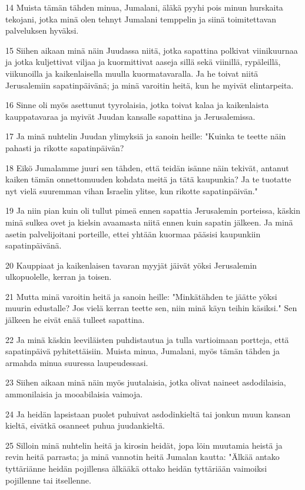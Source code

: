 \par 14 Muista tämän tähden minua, Jumalani, äläkä pyyhi pois minun hurskaita tekojani, jotka minä olen tehnyt Jumalani temppelin ja siinä toimitettavan palveluksen hyväksi.
\par 15 Siihen aikaan minä näin Juudassa niitä, jotka sapattina polkivat viinikuurnaa ja jotka kuljettivat viljaa ja kuormittivat aaseja sillä sekä viinillä, rypäleillä, viikunoilla ja kaikenlaisella muulla kuormatavaralla. Ja he toivat niitä Jerusalemiin sapatinpäivänä; ja minä varoitin heitä, kun he myivät elintarpeita.
\par 16 Sinne oli myös asettunut tyyrolaisia, jotka toivat kalaa ja kaikenlaista kauppatavaraa ja myivät Juudan kansalle sapattina ja Jerusalemissa.
\par 17 Ja minä nuhtelin Juudan ylimyksiä ja sanoin heille: "Kuinka te teette näin pahasti ja rikotte sapatinpäivän?
\par 18 Eikö Jumalamme juuri sen tähden, että teidän isänne näin tekivät, antanut kaiken tämän onnettomuuden kohdata meitä ja tätä kaupunkia? Ja te tuotatte nyt vielä suuremman vihan Israelin ylitse, kun rikotte sapatinpäivän."
\par 19 Ja niin pian kuin oli tullut pimeä ennen sapattia Jerusalemin porteissa, käskin minä sulkea ovet ja kielsin avaamasta niitä ennen kuin sapatin jälkeen. Ja minä asetin palvelijoitani porteille, ettei yhtään kuormaa pääsisi kaupunkiin sapatinpäivänä.
\par 20 Kauppiaat ja kaikenlaisen tavaran myyjät jäivät yöksi Jerusalemin ulkopuolelle, kerran ja toisen.
\par 21 Mutta minä varoitin heitä ja sanoin heille: "Minkätähden te jäätte yöksi muurin edustalle? Jos vielä kerran teette sen, niin minä käyn teihin käsiksi." Sen jälkeen he eivät enää tulleet sapattina.
\par 22 Ja minä käskin leeviläisten puhdistautua ja tulla vartioimaan portteja, että sapatinpäivä pyhitettäisiin. Muista minua, Jumalani, myös tämän tähden ja armahda minua suuressa laupeudessasi.
\par 23 Siihen aikaan minä näin myös juutalaisia, jotka olivat naineet asdodilaisia, ammonilaisia ja mooabilaisia vaimoja.
\par 24 Ja heidän lapsistaan puolet puhuivat asdodinkieltä tai jonkun muun kansan kieltä, eivätkä osanneet puhua juudankieltä.
\par 25 Silloin minä nuhtelin heitä ja kirosin heidät, jopa löin muutamia heistä ja revin heitä parrasta; ja minä vannotin heitä Jumalan kautta: "Älkää antako tyttäriänne heidän pojillensa älkääkä ottako heidän tyttäriään vaimoiksi pojillenne tai itsellenne.

